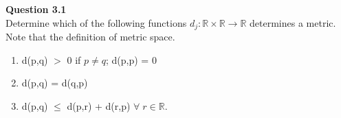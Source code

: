 \documentclass[12pt]{article}
\begin{document}
 


\noindent
\textbf{Question 3.1}\\
Determine which of the following functions $d_j : \mathbb{R} \times \mathbb{R} \rightarrow \mathbb{R}$ determines a metric.\\

\noindent
Note that the definition of metric space.
\begin{enumerate}[label=(\alph*)]
    \item d(p,q) $>$ 0 if $p\neq q$; d(p,p) = 0
    \item d(p,q) = d(q,p)
    \item d(p,q) $\le$ d(p,r) + d(r,p) \;\;$\forall\; r\in \mathbb{R}$.\\
\end{enumerate}
\end{document}
